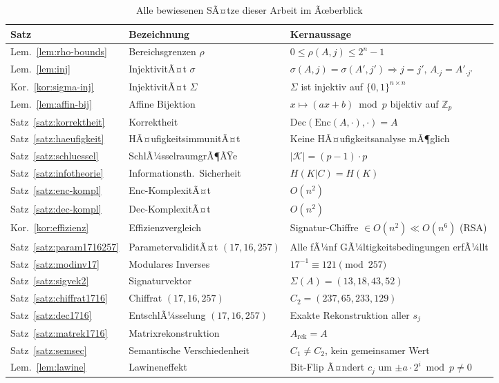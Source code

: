 ﻿\documentclass[a4paper,12pt]{scrreprt}
\theoremstyle{definition}
\begin{document}
\begin{table}[H]
\centering
\caption{Alle bewiesenen SÃ¤tze dieser Arbeit im Ãœberblick}
\label{tab:saetze}
\begin{tabular}{@{}p{1.2cm}p{4.5cm}p{7cm}@{}}
\toprule
\textbf{Satz} & \textbf{Bezeichnung} & \textbf{Kernaussage} \\
\midrule
Lem.~\ref{lem:rho-bounds} & Bereichsgrenzen $\rho$ & $0 \leq \rho(A,j) \leq 2^n-1$ \\
Lem.~\ref{lem:inj} & InjektivitÃ¤t $\sigma$ & $\sigma(A,j)=\sigma(A',j') \Rightarrow j=j',\,A_{\cdot j}=A'_{\cdot j'}$ \\
Kor.~\ref{kor:sigma-inj} & InjektivitÃ¤t $\Sigma$ & $\Sigma$ ist injektiv auf $\{0,1\}^{n\times n}$ \\
Lem.~\ref{lem:affin-bij} & Affine Bijektion & $x \mapsto (ax+b)\bmod p$ bijektiv auf $\mathbb{Z}_p$ \\
Satz~\ref{satz:korrektheit} & Korrektheit & $\mathrm{Dec}(\mathrm{Enc}(A,\cdot),\cdot)=A$ \\
Satz~\ref{satz:haeufigkeit} & HÃ¤ufigkeitsimmunitÃ¤t & Keine HÃ¤ufigkeitsanalyse mÃ¶glich \\
Satz~\ref{satz:schluessel} & SchlÃ¼sselraumgrÃ¶ÃŸe & $|\mathcal{K}|=(p-1)\cdot p$ \\
Satz~\ref{satz:infotheorie} & Informationsth.\ Sicherheit & $H(K|C)=H(K)$ \\
Satz~\ref{satz:enc-kompl} & Enc-KomplexitÃ¤t & $O(n^2)$ \\
Satz~\ref{satz:dec-kompl} & Dec-KomplexitÃ¤t & $O(n^2)$ \\
Kor.~\ref{kor:effizienz} & Effizienzvergleich & Signatur-Chiffre $\in O(n^2) \ll O(n^6)$ (RSA) \\
Satz~\ref{satz:param1716257} & ParametervaliditÃ¤t $(17,16,257)$ & Alle fÃ¼nf GÃ¼ltigkeitsbedingungen erfÃ¼llt \\
Satz~\ref{satz:modinv17} & Modulares Inverses & $17^{-1}\equiv 121\pmod{257}$ \\
Satz~\ref{satz:sigvek2} & Signaturvektor & $\Sigma(A)=(13,18,43,52)$ \\
Satz~\ref{satz:chiffrat1716} & Chiffrat $(17,16,257)$ & $C_2=(237,65,233,129)$ \\
Satz~\ref{satz:dec1716} & EntschlÃ¼sselung $(17,16,257)$ & Exakte Rekonstruktion aller $s_j$ \\
Satz~\ref{satz:matrek1716} & Matrixrekonstruktion & $A_{\mathrm{rek}} = A$ \\
Satz~\ref{satz:semsec} & Semantische Verschiedenheit & $C_1 \neq C_2$, kein gemeinsamer Wert \\
Lem.~\ref{lem:lawine} & Lawineneffekt & Bit-Flip Ã¤ndert $c_j$ um $\pm a\cdot 2^i \bmod p \neq 0$ \\
\bottomrule
\end{tabular}
\end{table}
\end{document}
